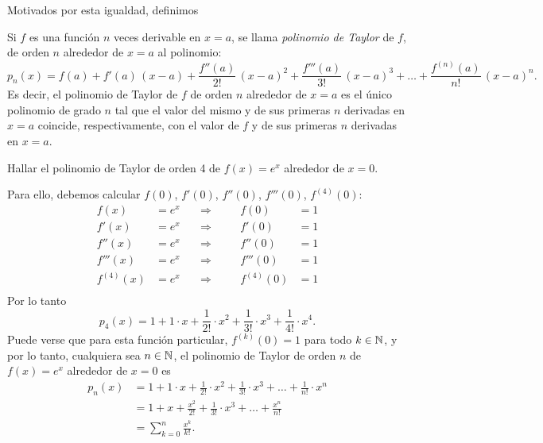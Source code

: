 Motivados por esta igualdad, definimos

\begin{definition}
 Si $f$ es una función $n$ veces derivable en $x=a$, se llama \emph{polinomio de Taylor} de $f$, de orden $n$ alrededor de $x=a$ al polinomio:
\[
 p_n(x) = f(a) + f'(a) \, (x-a) + \frac{f''(a)}{2!}\, (x-a)^2 + \frac{f'''(a)}{3!}\, (x-a)^3 + \dots
 + \frac{f^{(n)}(a)}{n!} \, (x-a)^{n}.
\]
Es decir, el polinomio de Taylor de $f$ de orden $n$ alrededor de $x=a$ es el único polinomio de grado $n$ tal que el valor del mismo y de sus primeras $n$ derivadas en $x=a$ coincide, respectivamente, con el valor de $f$ y de sus primeras $n$ derivadas en $x=a$.
\end{definition}

\begin{example}
 Hallar el polinomio de Taylor de orden 4 de $f(x) = e^x$ alrededor de $x=0$.

 Para ello, debemos calcular $f(0)$, $f'(0)$, $f''(0)$, $f'''(0)$, $f^{(4)}(0)$:
\[
\begin{aligned}
 f(x) &= e^x  \quad &\Longrightarrow & &\quad f(0)  &= 1 \\
 f'(x) &= e^x \quad &\Longrightarrow& & \quad f'(0) &= 1 \\
 f''(x) &= e^x \quad &\Longrightarrow& & \quad f''(0) &= 1 \\
 f'''(x) &= e^x \quad &\Longrightarrow& & \quad f'''(0) &= 1 \\
 f^{(4)}(x) &= e^x \quad &\Longrightarrow& & \quad f^{(4)}(0) &= 1 \\
\end{aligned}
\]
Por lo tanto 
\[
 p_4(x) = 1 + 1 \cdot x + \frac{1}{2!} \cdot x^2 + \frac{1}{3!} \cdot x^3 +  \frac{1}{4!} \cdot x^4 .
\]
Puede verse que para esta función particular, $f^{(k)}(0) = 1$ para todo $k \in \mathbb{N}$, y por lo tanto, cualquiera sea $n\in\mathbb{N}$, el polinomio de Taylor de orden $n$ de $f(x) = e^x$ alrededor de $x=0$ es
\begin{align*}
 p_n(x) &= 1 + 1 \cdot x + \frac{1}{2!} \cdot x^2 + \frac{1}{3!} \cdot x^3 +\dots +  \frac{1}{n!} \cdot x^n \\
&= 1 +  x + \frac{x^2}{2!} + \frac{1}{3!} \cdot x^3 + \dots +  \frac{x^n}{n!}  \\
&= \sum_{k=0}^n \frac{x^k}{k!}.
\end{align*}
\end{example}

